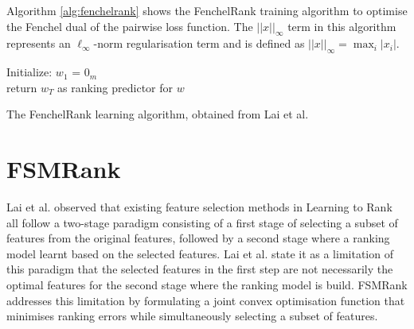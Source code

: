Algorithm \ref{alg:fenchelrank} shows the FenchelRank training algorithm to optimise the Fenchel dual of the pairwise loss function. The $||x||_\infty$ term in this algorithm represents an $\ell_\infty$-norm regularisation term and is defined as $||x||_\infty=\max_{i}|x_i|$.\\

\LinesNumbered
\begin{algorithm}[H]
 Initialize: $w_1$ = $0_m$\\
 return $w_{T}$ as ranking predictor for $w$
 \caption{The FenchelRank learning algorithm, obtained from Lai et al. \cite{Lai2013}}
 \label{alg:fenchelrank}
\end{algorithm}

\section{FSMRank}
Lai et al. \cite{Lai2013c} observed that existing feature selection methods in Learning to Rank all follow a two-stage paradigm consisting of a first stage of selecting a subset of features from the original features, followed by a second stage where a ranking model learnt based on the selected features. Lai et al. \cite{Lai2013c} state it as a limitation of this paradigm that the selected features in the first step are not necessarily the optimal features for the second stage where the ranking model is build. FSMRank \cite{Lai2013c} addresses this limitation by formulating a joint convex optimisation function that minimises ranking errors while simultaneously selecting a subset of features.\\

